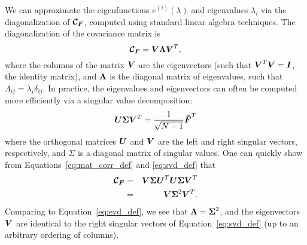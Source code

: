 We can approximate the eigenfunctions $e^{(i)}(\lambda)$ and
eigenvalues $\lambda_i$ via the diagonalization 
of $\boldsymbol{\mathcal{C}_F}$, computed using standard linear algebra techniques.
The diagonalization of the covariance matrix is
\begin{equation}
  \label{eq:evd_def}
  \boldsymbol{\mathcal{C}_F} = \boldsymbol{V}\boldsymbol{\Lambda}\boldsymbol{V}^T,
\end{equation}
where the columns of the matrix $\boldsymbol{V}$ are the eigenvectors
(such that $\boldsymbol{V}^T \boldsymbol{V} = \boldsymbol{I}$, the identity matrix), and
$\boldsymbol{\Lambda}$ is the diagonal matrix of eigenvalues, such that
$\Lambda_{ij} = \lambda_i\delta_{ij}$.  In practice, the eigenvalues and
eigenvectors can often be computed more efficiently via a singular value
decomposition:
\begin{equation}
  \label{eq:svd_def}
  \boldsymbol{U}\boldsymbol{\Sigma}\boldsymbol{V}^T
  = \frac{1}{\sqrt{N - 1}}\boldsymbol{\tilde{F}}^T
\end{equation}
where the orthogonal matrices $\boldsymbol{U}$ and $\boldsymbol{V}$ are the left and
right singular vectors, respectively, and $\Sigma$ is a diagonal matrix
of singular values.  One can quickly show from Equations~\ref{eq:mat_corr_def}
and \ref{eq:svd_def} that
\begin{eqnarray}
  \boldsymbol{\mathcal{C}_F}
  &=& \boldsymbol{V}\boldsymbol{\Sigma}\boldsymbol{U}^T
  \boldsymbol{U}\boldsymbol{\Sigma}\boldsymbol{V}^T\nonumber\\
  &=& \boldsymbol{V}\boldsymbol{\Sigma}^2\boldsymbol{V}^T.
\end{eqnarray}
Comparing to Equation~\ref{eq:evd_def}, we see that 
$\boldsymbol{\Lambda} = \boldsymbol{\Sigma}^2$, and the eigenvectors $\boldsymbol{V}$ are
identical to the right singular vectors of Equation~\ref{eq:svd_def}
(up to an arbitrary ordering of columns).


\newpage

















